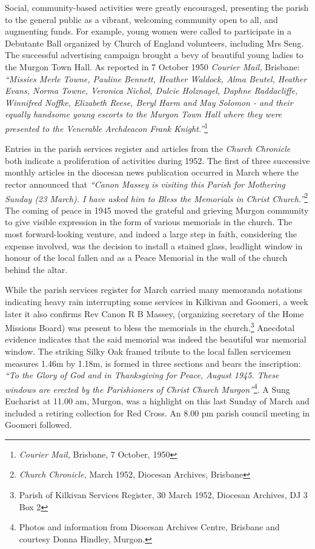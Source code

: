 Social, community-based activities were greatly encouraged, presenting the parish to the general public as a vibrant, welcoming community open to all, and augmenting funds. For example, young women were called to participate in a Debutante Ball organized by Church of England volunteers, including Mrs Seng. The successful advertising campaign brought a bevy of beautiful young ladies to the Murgon Town Hall. As reported in 7 October 1950 \emph{Courier Mail,} Brisbane: \emph{``Missies Merle Towne, Pauline Bennett, Heather Waldock, Alma Beutel, Heather Evans, Norma Towne, Veronica Nichol, Dulcie Holznagel, Daphne Raddacliffe, Winnifred Noffke, Elizabeth Reese, Beryl Harm and May Solomon - and their equally handsome young escorts to the Murgon Town Hall where they were presented to the Venerable Archdeacon Frank Knight.''}\footnote{\emph{Courier Mail,} Brisbane, 7 October, 1950}


Entries in the parish services register and articles from the \emph{Church Chronicle} both indicate a proliferation of activities during 1952. The first of three successive monthly articles in the diocesan news publication occurred in March where the rector announced that \emph{``Canon Massey is visiting this Parish for Mothering Sunday (23 March). I have asked him to Bless the Memorials in Christ Church.''}\footnote{\emph{Church Chronicle,} March 1952, Diocesan Archives, Brisbane} The coming of peace in 1945 moved the grateful and grieving Murgon community to give visible expression in the form of various memorials in the church. The most forward-looking venture, and indeed a large step in faith, considering the expense involved, was the decision to install a stained glass, leadlight window in honour of the local fallen and as a Peace Memorial in the wall of the church behind the altar.


While the parish services register for March carried many memoranda notations indicating heavy rain interrupting some services in Kilkivan and Goomeri, a week later it also confirms Rev Canon R B Massey, (organizing secretary of the Home Missions Board) was present to bless the memorials in the church.\footnote{Parish of Kilkivan Services Register, 30 March 1952, Diocesan Archives, DJ 3 Box 2} Anecdotal evidence indicates that the said memorial was indeed the beautiful war memorial window. The striking Silky Oak framed tribute to the local fallen servicemen measures 1.46m by 1.18m, is formed in three sections and bears the inscription: \emph{``To the Glory of God and in Thanksgiving for Peace, August 1945. These windows are erected by the Parishioners of Christ Church Murgon''}\footnote{Photos and information from Diocesan Archives Centre, Brisbane and courtesy Donna Hindley, Murgon.}. A Sung Eucharist at 11.00 am, Murgon, was a highlight on this last Sunday of March and included a retiring collection for Red Cross. An 8.00 pm parish council meeting in Goomeri followed.








